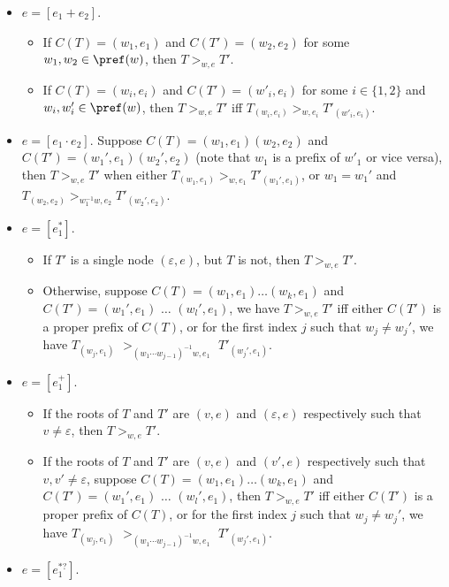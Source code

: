 \begin{definition}
\begin{itemize}
  		\item $e = [e_1 + e_2]$.
  		\begin{itemize}
  			\item If $C (T) = (w_1, e_1)$ and $C (T') = (w_2, e_2)$ for some $w_1, w_2 \in \pref(w)$, then $T >_{w,e} T'$.
%  			
  			\item If $C (T) = (w_i, e_i)$ and $C (T') = (w'_i, e_i)$ for some $i \in \{ 1,
  			2 \}$ and $w_i, w'_i \in \pref(w)$, then $T >_{w,e} T'$ iff $T_{(w_i, e_i)} >_{w, e_i} T'_{(w'_i, e_i)}$.
  		\end{itemize}
  		\item $e = [e_1 \cdot e_2]$. Suppose $C (T) = (w_1, e_1) (w_2, e_2)$ and $C (T') =
  		(w_1', e_1) (w_2', e_2)$ (note that $w_1$ is a prefix of $w'_1$ or vice versa), then $T >_{w,e} T'$ when either $T_{(w_1, e_1)} >_{w, e_1}
  		T'_{(w_1', e_1)}$, or $w_1 = w_1'$ and $T_{(w_2, e_2)} >_{w_1^{-1}w, e_2} T'_{(w_2', e_2)}$. 
%  		
  		\item $e = [e_1^{\ast}]$. 
		\begin{itemize}
		\item If $T' $ is  a single node $(\varepsilon, e)$, but $T$ is not, then $T >_{w, e} T'$.
  		\item Otherwise, suppose $C(T) = (w_1, e_1) \ldots (w_k, e_1)$ and $C (T') =
  		(w_1', e_1)$ $\ldots$ $(w_l', e_1)$, we have $T >_{w,e} T'$ iff either $C (T')$
  		is a proper prefix of $C (T)$, or for the first index $j$ such that $w_j
  		\neq w_j'$, we have $T_{(w_j, e_1)}$ $>_{(w_1\cdots w_{j-1})^{-1}w, e_1}$ $T'_{(w_j', e_1)}$.
		\end{itemize}
%
  		\item $e = [e_1^{+}]$. 
		\begin{itemize}
		\item If the roots of $T$ and $T' $ are  $(v, e)$ and $(\varepsilon, e)$ respectively such that $v \neq \varepsilon$, then $T >_{w, e} T'$.
  		\item If the roots of $T$ and $T' $ are $(v, e)$ and $(v', e)$ respectively such that $v, v' \neq \varepsilon$,  suppose $C(T) = (w_1, e_1) \ldots (w_k, e_1)$ and $C (T') =
  		(w_1', e_1)$ $\ldots$ $(w_l', e_1)$, then $T >_{w,e} T'$ iff either $C(T')$
  		is a proper prefix of $C (T)$, or for the first index $j$ such that $w_j
  		\neq w_j'$, we have $T_{(w_j, e_1)}$ $>_{(w_1\cdots w_{j-1})^{-1}w, e_1}$ $T'_{(w_j', e_1)}$.
		\end{itemize}
%
  		\item $e = [e_1^{\ast?}]$. 
		\begin{itemize}

\end{itemize}
\end{itemize}
\end{definition}
